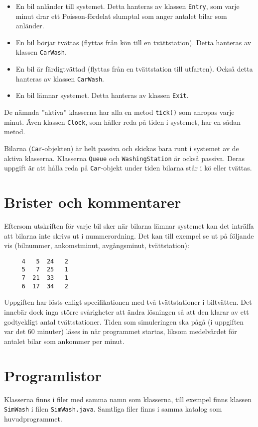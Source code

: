 \documentclass[a4paper]{article}
\newcommand{\code}[1]{\texttt{#1}} %
\begin{document}
\begin{itemize}
\item En bil anländer till systemet. Detta hanteras av klassen \code{Entry}, som varje minut drar ett Poisson-fördelat slumptal som anger antalet bilar som anländer.
\item En bil börjar tvättas (flyttas från kön till en tvättstation). Detta hanteras av klassen \code{CarWash}.
\item En bil är färdigtvättad (flyttas från en tvättstation till utfarten). Också detta hanteras av klassen \code{CarWash}.
\item En bil lämnar systemet. Detta hanteras av klassen \code{Exit}.
\end{itemize}


De nämnda ''aktiva'' klasserna har alla en metod \code{tick()} som anropas varje minut. Även klassen \code{Clock}, som håller reda på tiden i systemet, har en sådan metod.

Bilarna (\code{Car}-objekten) är helt passiva och skickas bara runt i systemet av de aktiva klasserna. Klasserna \code{Queue} och \code{WashingStation} är också passiva. Deras uppgift är att hålla reda på \code{Car}-objekt under tiden bilarna står i kö eller tvättas. 


\section{Brister och kommentarer}
Eftersom utskriften för varje bil sker när bilarna lämnar systemet kan det inträffa att bilarna inte skrivs ut i nummerordning. Det kan till exempel se ut på följande vis (bilnummer, ankomst\-minut, avgångsminut, tvättstation):

\begin{Verbatim}
     4   5  24   2
     5   7  25   1
     7  21  33   1
     6  17  34   2
\end{Verbatim}

Uppgiften har lösts enligt specifikationen med två tvättstationer i biltvätten. Det innebär dock inga större svårigheter att ändra lösningen så att den klarar av ett godtyckligt antal tvätt\-stationer. Tiden som simuleringen ska pågå (i uppgiften var det 60 minuter) läses in när programmet startas, liksom medelvärdet för antalet bilar som ankommer per minut.


\section{Programlistor}
Klasserna finns i filer med samma namn som klasserna, till exempel finns klassen \code{SimWash} i filen \code{SimWash.java}. Samtliga filer finns i samma katalog som huvudprogrammet.
\end{document}
